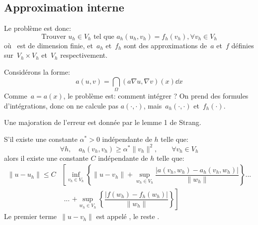 \medskip
\subsection{Approximation interne}

Le problème est donc:
\begin{equation}
\text{Trouver } u_h\in V_h \text{ tel que } a_h(u_h,v_h) = f_h(v_h), \forall v_h\in V_h
\end{equation}
où~ est de dimension finie, et~$a_h$ et~$f_h$ sont des approximations de~$a$ et~$f$ définies sur~$V_h\times V_h$ et~$V_h$ respectivement. 

\begin{remarque}[Motivation]
Considérons la forme:
\begin{equation}a(u,v)=\dint_\Omega (a\nabla u,\nabla v)(x)\dd x\end{equation}
Comme~$a=a(x)$, le problème est: comment intégrer ?
On prend des formules d'intégrations, donc on ne calcule pas $a(\cdot,\cdot)$,
mais~$a_h(\cdot,\cdot)$ et~$f_h(\cdot)$.
\end{remarque}

Une majoration de l'erreur est donnée par le lemme 1 de Strang.

\begin{lemme}
S'il existe une constante $\alpha^*>0$ indépendante de $h$ telle que:
\begin{equation*}
\forall h, \quad a_h(v_h,v_h)\ge\alpha^*\|v_h\|^2, \qquad \forall v_h\in V_h
\end{equation*}
alors il existe une constante $C$ indépendante de $h$ telle que:
\begin{equation}
\begin{aligned}
\|u-u_h\|\le C &\left[
\inf_{v_h\in V_h} \left\{ \|u-v_h\| + \sup_{w_h\in V_h} \dfrac{|a(v_h,w_h)-a_h(v_h,w_h)|}{\|w_h\|}\right\} \textbf{...}\right.\\
& \textbf{ ... }\left. +\sup_{w_h\in V_h}\left\{\dfrac{|f(w_h)-f_h(w_h)|}{\|w_h\|}\right\}
\right]
\end{aligned}
\end{equation}
Le premier terme~$\|u-v_h\|$ est appelé ,
le reste .
\end{lemme}

